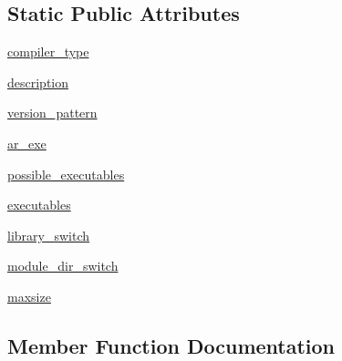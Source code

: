 \subsection*{Static Public Attributes}
\begin{DoxyCompactItemize}
\item 
\hyperlink{classnumpy_1_1distutils_1_1fcompiler_1_1pg_1_1PGroupFlangCompiler_a70579cd971b50cdd350486f4b81a552e}{compiler\+\_\+type}
\item 
\hyperlink{classnumpy_1_1distutils_1_1fcompiler_1_1pg_1_1PGroupFlangCompiler_a4c280ccb0263e1c6599aa411840899b6}{description}
\item 
\hyperlink{classnumpy_1_1distutils_1_1fcompiler_1_1pg_1_1PGroupFlangCompiler_ad904bc947a2ccf9c1211e88cb8e44477}{version\+\_\+pattern}
\item 
\hyperlink{classnumpy_1_1distutils_1_1fcompiler_1_1pg_1_1PGroupFlangCompiler_adb07d58fca569c5928776581eb118c01}{ar\+\_\+exe}
\item 
\hyperlink{classnumpy_1_1distutils_1_1fcompiler_1_1pg_1_1PGroupFlangCompiler_ad5d5ce57f604a8d93c28dbafdf502adb}{possible\+\_\+executables}
\item 
\hyperlink{classnumpy_1_1distutils_1_1fcompiler_1_1pg_1_1PGroupFlangCompiler_a08787fea7ecfdd4d617a9f43b4fa321f}{executables}
\item 
\hyperlink{classnumpy_1_1distutils_1_1fcompiler_1_1pg_1_1PGroupFlangCompiler_ae01aaaa8221f60340dbf04e760bff5c6}{library\+\_\+switch}
\item 
\hyperlink{classnumpy_1_1distutils_1_1fcompiler_1_1pg_1_1PGroupFlangCompiler_a283e9e6511a0034f4b6fbfdcf3e58375}{module\+\_\+dir\+\_\+switch}
\item 
\hyperlink{classnumpy_1_1distutils_1_1fcompiler_1_1pg_1_1PGroupFlangCompiler_a52602f1d89c5b507817b3a4aa59df0cd}{maxsize}
\end{DoxyCompactItemize}


\subsection{Member Function Documentation}
\mbox{\label{classnumpy_1_1distutils_1_1fcompiler_1_1pg_1_1PGroupFlangCompiler_ae8ce09bb44ee6056ebb22341802b151b}} 
